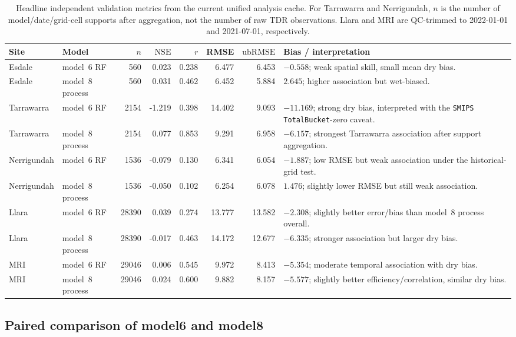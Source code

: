 \documentclass[11pt,a4paper]{article}
\newcommand{\nse}{\ensuremath{\mathrm{NSE}}}
\newcommand{\ubrmse}{\ensuremath{\mathrm{ubRMSE}}}
\newcommand{\pearsonr}{\ensuremath{r}}
\newcommand{\modelSix}{model~6 RF}
\newcommand{\modelEight}{model~8 process}
\newcommand{\smips}{\texttt{SMIPS TotalBucket}}
\begin{document}
\begin{table}[htbp]
\centering
\small
\caption{Headline independent validation metrics from the current unified
analysis cache.  For Tarrawarra and Nerrigundah, $n$ is the number of
model/date/grid-cell supports after aggregation, not the number of raw TDR
observations.  Llara and MRI are QC-trimmed to 2022-01-01 and 2021-07-01,
respectively.}
\label{tab:headline-metrics}
\begin{tabularx}{\textwidth}{llrrrrrX}
\toprule
Site & Model & $n$ & \nse{} & $\pearsonr$ & RMSE & \ubrmse{} & Bias / interpretation \\
\midrule
Esdale & \modelSix{} & 560 & 0.023 & 0.238 & 6.477 & 6.453
  & $-0.558$; weak spatial skill, small mean dry bias. \\
Esdale & \modelEight{} & 560 & 0.031 & 0.462 & 6.452 & 5.884
  & $2.645$; higher association but wet-biased. \\
Tarrawarra & \modelSix{} & 2154 & -1.219 & 0.398 & 14.402 & 9.093
  & $-11.169$; strong dry bias, interpreted with the \smips{}-zero caveat. \\
Tarrawarra & \modelEight{} & 2154 & 0.077 & 0.853 & 9.291 & 6.958
  & $-6.157$; strongest Tarrawarra association after support aggregation. \\
Nerrigundah & \modelSix{} & 1536 & -0.079 & 0.130 & 6.341 & 6.054
  & $-1.887$; low RMSE but weak association under the historical-grid test. \\
Nerrigundah & \modelEight{} & 1536 & -0.050 & 0.102 & 6.254 & 6.078
  & $1.476$; slightly lower RMSE but still weak association. \\
Llara & \modelSix{} & 28390 & 0.039 & 0.274 & 13.777 & 13.582
  & $-2.308$; slightly better error/bias than \modelEight{} overall. \\
Llara & \modelEight{} & 28390 & -0.017 & 0.463 & 14.172 & 12.677
  & $-6.335$; stronger association but larger dry bias. \\
MRI & \modelSix{} & 29046 & 0.006 & 0.545 & 9.972 & 8.413
  & $-5.354$; moderate temporal association with dry bias. \\
MRI & \modelEight{} & 29046 & 0.024 & 0.600 & 9.882 & 8.157
  & $-5.577$; slightly better efficiency/correlation, similar dry bias. \\
\bottomrule
\end{tabularx}
\end{table}

\subsection{Paired comparison of model6 and model8}\label{sec:stage1-paired}
\end{document}
